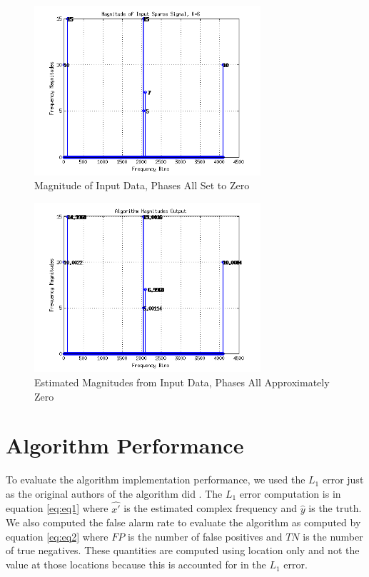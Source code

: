 \documentclass[journal]{IEEEtran}
\begin{document}
\begin{figure}[h!]
\centering
\includegraphics[width=3.3in]{../images/inputdata.png}
\caption{Magnitude of Input Data, Phases All Set to Zero}
\label{fig:inputdata}
\end{figure}

\begin{figure}[h!]
\centering
\includegraphics[width=3.3in]{../images/FinalResult.png}
\caption{Estimated Magnitudes from Input Data, Phases All Approximately Zero}
\label{fig:FinalResult}
\end{figure}

\section{Algorithm Performance}
\par To evaluate the algorithm implementation performance, we used the \(L_1\) error just as the original authors of the algorithm did \cite{hass}. The \(L_1\) error computation is in equation \ref{eq:eq1} where \(\hat{x'}\) is the estimated complex frequency and \(\hat{y}\) is the truth. We also computed the false alarm rate to evaluate the algorithm as computed by equation \ref{eq:eq2} where \(FP\) is the number of false positives and \(TN\) is the number of true negatives. These quantities are computed using location only and not the value at those locations because this is accounted for in the \(L_1\) error.
\end{document}

